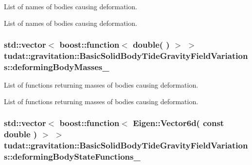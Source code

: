 List of names of bodies causing deformation. 

List of names of bodies causing deformation. 
\subsubsection[{\texorpdfstring{deforming\+Body\+Masses\+\_\+}{deformingBodyMasses_}}]{\setlength{\rightskip}{0pt plus 5cm}std\+::vector$<$ boost\+::function$<$ double( ) $>$ $>$ tudat\+::gravitation\+::\+Basic\+Solid\+Body\+Tide\+Gravity\+Field\+Variations\+::deforming\+Body\+Masses\+\_\+\hspace{0.3cm}{\ttfamily [protected]}}\hypertarget{classtudat_1_1gravitation_1_1BasicSolidBodyTideGravityFieldVariations_a001d0bd58615e93f73ec72849d03298d}{}\label{classtudat_1_1gravitation_1_1BasicSolidBodyTideGravityFieldVariations_a001d0bd58615e93f73ec72849d03298d}


List of functions returning masses of bodies causing deformation. 

List of functions returning masses of bodies causing deformation. 
\subsubsection[{\texorpdfstring{deforming\+Body\+State\+Functions\+\_\+}{deformingBodyStateFunctions_}}]{\setlength{\rightskip}{0pt plus 5cm}std\+::vector$<$ boost\+::function$<$ Eigen\+::\+Vector6d( const double ) $>$ $>$ tudat\+::gravitation\+::\+Basic\+Solid\+Body\+Tide\+Gravity\+Field\+Variations\+::deforming\+Body\+State\+Functions\+\_\+\hspace{0.3cm}{\ttfamily [protected]}}\hypertarget{classtudat_1_1gravitation_1_1BasicSolidBodyTideGravityFieldVariations_aa007e8a4b2423b484bf49eb46dac39c9}{}\label{classtudat_1_1gravitation_1_1BasicSolidBodyTideGravityFieldVariations_aa007e8a4b2423b484bf49eb46dac39c9}


